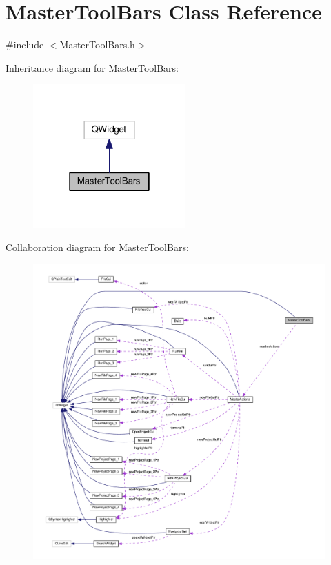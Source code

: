 \hypertarget{class_master_tool_bars}{\section{Master\-Tool\-Bars Class Reference}
\label{class_master_tool_bars}
}


{\ttfamily \#include $<$Master\-Tool\-Bars.\-h$>$}



Inheritance diagram for Master\-Tool\-Bars\-:\nopagebreak
\begin{figure}[H]
\begin{center}
\leavevmode
\includegraphics[width=166pt]{class_master_tool_bars__inherit__graph}
\end{center}
\end{figure}


Collaboration diagram for Master\-Tool\-Bars\-:
\nopagebreak
\begin{figure}[H]
\begin{center}
\leavevmode
\includegraphics[width=350pt]{class_master_tool_bars__coll__graph}
\end{center}
\end{figure}
